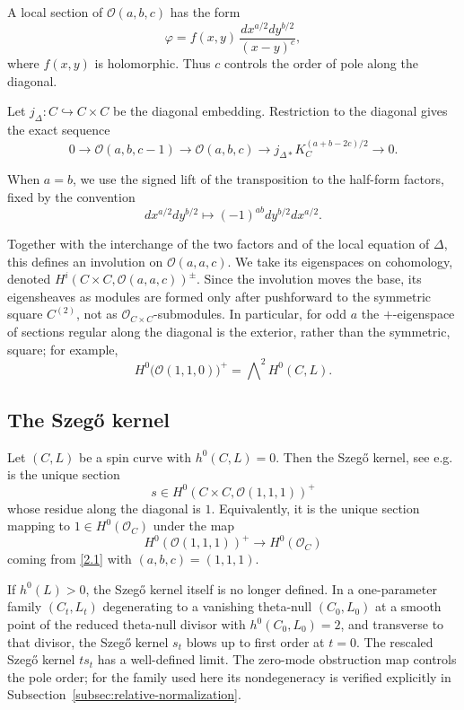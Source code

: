 \documentclass[11pt]{article}
\newcommand{\OO}{\mathcal O}
\begin{document}
A local section of $\OO(a,b,c)$ has the form
\[
\varphi=f(x,y)\,\frac{dx^{a/2}dy^{b/2}}{(x-y)^c},
\]
where $f(x,y)$ is holomorphic. Thus $c$ controls the order of pole along the diagonal.

{Let $j_\Delta:C\hookrightarrow C\times C$ be the diagonal embedding.}
Restriction to the diagonal gives the exact sequence
\begin{equation} \label{2.1}
0\to \OO(a,b,c-1)\to \OO(a,b,c)\to {j_{\Delta*}K_C^{(a+b-2c)/2}}\to 0.
\end{equation}

When $a=b$, we use the signed lift of the transposition to the half-form factors, fixed by the convention
\begin{equation} \label{lift}
    dx^{a/2}dy^{b/2}\longmapsto(-1)^{ab}dy^{b/2}dx^{a/2}.
\end{equation}

Together with the interchange of the two factors and of the local equation of $\Delta$, this defines an involution on $\OO(a,a,c)$.
{We take its eigenspaces on cohomology, denoted
$H^i(C\times C,\OO(a,a,c))^\pm$. Since the involution moves the base,
its eigensheaves as modules are formed only after pushforward to the
symmetric square $C^{(2)}$, not as $\OO_{C\times C}$-submodules.}
In particular, for odd $a$ the $+$-eigenspace of sections regular along the diagonal is the exterior, rather than the symmetric, square; for example,
\[
{H^0\bigl(\OO(1,1,0)\bigr)^+}=\bigwedge\nolimits^2H^0(C,L).
\]

\subsection{The Szeg\H{o} kernel}

Let $(C,L)$ be a spin curve with $h^0(C,L)=0$.
Then the Szeg\H{o} kernel, see e.g. \cite{BZB, CV, FI, FKP} is the unique section
\[
s\in {H^0(C\times C,\OO(1,1,1))^+}
\]
whose residue along the diagonal is $1$. Equivalently, it is the unique section mapping to $1\in H^0(\OO_C)$ under the map
\[
{H^0(\OO(1,1,1))^+} \longrightarrow H^0(\OO_C)
\]
coming from \eqref{2.1} with $(a,b,c)=(1,1,1)$.

If $h^0(L)>0$, the Szeg\H{o} kernel itself is no longer defined.
In a one-parameter family $(C_t,L_t)$
degenerating to a vanishing theta-null $(C_0,L_0)$
{at a smooth point of the reduced theta-null divisor with $h^0(C_0,L_0)=2$, and transverse to that divisor,}
the Szeg\H{o} kernel $s_t$ blows up to first order at $t=0$.
The rescaled Szeg\H{o} kernel $ts_t$ has a well-defined limit.
{The zero-mode obstruction map controls the pole order; for the
family used here its nondegeneracy is verified explicitly in
Subsection~{\ref{subsec:relative-normalization}}.}
\end{document}
